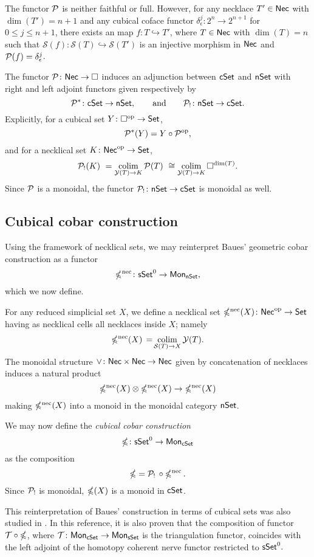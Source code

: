 \begin{remark*}
	The functor $\mathcal{P}$ is neither faithful or full.
	However, for any necklace $T' \in \mathsf{Nec}$ with $\dim(T')=n+1$ and any cubical coface functor $\delta_{\epsilon}^j \colon 2^n \to 2^{n+1}$ for $0 \leq j \leq n+1$, there exists an map $f \colon T \hookrightarrow T'$, where $T \in \mathsf{Nec}$ with $\dim(T)=n$ such that $\mathcal{S}(f) \colon \mathcal{S}(T) \hookrightarrow \mathcal{S}(T')$ is an injective morphism in $\mathsf{Nec}$ and $\mathcal{P}(f) = \delta_{\epsilon}^j$.
\end{remark*}

The functor $\mathcal{P} \colon \mathsf{Nec} \to \square$ induces an adjunction between $\mathsf{cSet}$ and $\mathsf{nSet}$ with right and left adjoint functors given respectively by
\[
\mathcal{P}^\ast \colon \mathsf{cSet} \to \mathsf{nSet},
\qquad \text{and} \qquad
\mathcal{P}_{!} \colon \mathsf{nSet} \to \mathsf{cSet}.
\]
Explicitly, for a cubical set $Y \colon \square^{\mathrm{op}} \to \mathsf{Set}$,
\[
\mathcal{P}^\ast(Y)= Y \circ \mathcal{P}^{\mathrm{op}},
\]
and for a necklical set $K \colon \mathsf{Nec}^{\mathrm{op}} \to \mathsf{Set}$,
\[
\mathcal{P}_{!}(K) \ =
\operatorname*{colim}_{\mathcal{Y}(T) \to K} \mathcal{P}(T) \ \cong
\operatorname*{colim}_{\mathcal{Y}(T) \to K} \square^{\dim(T)}.
\]
Since $\mathcal{P}$ is a monoidal, the functor $\mathcal{P}_{!} \colon \mathsf{nSet} \to \mathsf{cSet}$ is monoidal as well.

\subsection{Cubical cobar construction}\label{ss:cubical cobar}

Using the framework of necklical sets, we may reinterpret Baues' geometric cobar construction \cite{baues1980geometry} as a functor
\[
\operatorname{\mathbb{\Omega}^{\mathrm{nec}}} \colon \mathsf{sSet}^0 \to \mathsf{Mon}_{\mathsf{nSet}},
\]
which we now define.

For any reduced simplicial set $X$, we define a necklical set $\operatorname{\mathbb{\Omega}^{\mathrm{nec}}}(X) \colon \mathsf{Nec}^{\mathrm{op}} \to \mathsf{Set}$ having as necklical cells all necklaces inside $X$; namely
\[
\operatorname{\mathbb{\Omega}^{\mathrm{nec}}}(X) \, = \! \operatorname*{colim}_{\mathcal{S}(T) \to X} \mathcal{Y}(T).
\]
The monoidal structure $\vee \colon \mathsf{Nec} \times \mathsf{Nec} \to \mathsf{Nec}$ given by concatenation of necklaces induces a natural product
\[
\operatorname{\mathbb{\Omega}^{\mathrm{nec}}}(X) \otimes \operatorname{\mathbb{\Omega}^{\mathrm{nec}}}(X) \to \operatorname{\mathbb{\Omega}^{\mathrm{nec}}}(X)
\]
making $\operatorname{\mathbb{\Omega}^{\mathrm{nec}}}(X)$ into a monoid in the monoidal category $\mathsf{nSet}$.

We may now define the \textit{cubical cobar construction}
\[
\operatorname{\mathbb{\Omega}} \colon \mathsf{sSet}^0 \to \mathsf{Mon}_{\mathsf{cSet}}
\]
as the composition
\[
\operatorname{\mathbb{\Omega}} = \mathcal{P}_! \, \circ \operatorname{\mathbb{\Omega}^{\mathrm{nec}}}.
\]
Since $\mathcal{P}_!$ is monoidal, $\operatorname{\mathbb{\Omega}}(X)$ is a monoid in $\mathsf{cSet}$.

\begin{remark}
	This reinterpretation of Baues' construction in terms of cubical sets was also studied in \cite{rivera2018cubical}.
	In this reference, it is also proven that the composition of functor $\mathcal{T} \circ \operatorname{\mathbb{\Omega}}$, where $\mathcal{T} \colon \mathsf{Mon}_{\mathsf{cSet}} \to \mathsf{Mon}_{\mathsf{sSet}}$ is the triangulation functor, coincides with the left adjoint of the homotopy coherent nerve functor restricted to $\mathsf{sSet}^0.$
\end{remark}

